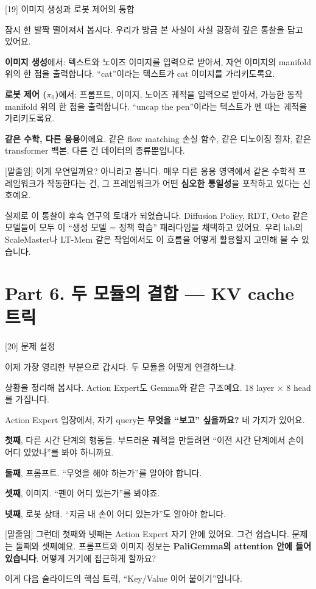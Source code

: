 \documentclass[aspectratio=169,10pt]{beamer}
\newenvironment{script}{%
  \footnotesize
  \setlength{\parskip}{0.5em}
  \setlength{\parindent}{0pt}
}{}
\begin{document}
\begin{frame}{[19] 이미지 생성과 로봇 제어의 통합}
\begin{script}
잠시 한 발짝 떨어져서 봅시다. 우리가 방금 본 사실이 사실 굉장히 깊은 통찰을 담고 있어요.

\textbf{이미지 생성}에서: 텍스트와 노이즈 이미지를 입력으로 받아서, 자연 이미지의 manifold 위의 한 점을 출력합니다. ``cat''이라는 텍스트가 cat 이미지를 가리키도록요.

\textbf{로봇 제어 ($\pi_0$)}에서: 프롬프트, 이미지, 노이즈 궤적을 입력으로 받아서, 가능한 동작 manifold 위의 한 점을 출력합니다. ``uncap the pen''이라는 텍스트가 펜 따는 궤적을 가리키도록요.

\textbf{같은 수학, 다른 응용}이에요. 같은 flow matching 손실 함수, 같은 디노이징 절차, 같은 transformer 백본. 다른 건 데이터의 종류뿐입니다.

[말줄임] 이게 우연일까요? 아니라고 봅니다. \alert{매우 다른 응용 영역에서 같은 수학적 프레임워크가 작동한다}는 건, 그 프레임워크가 어떤 \textbf{심오한 통일성}을 포착하고 있다는 신호예요.

실제로 이 통찰이 후속 연구의 토대가 되었습니다. Diffusion Policy, RDT, Octo 같은 모델들이 모두 이 ``생성 모델 = 정책 학습'' 패러다임을 채택하고 있어요. 우리 lab의 ScaleMaster나 LT-Mem 같은 작업에서도 이 흐름을 어떻게 활용할지 고민해 볼 수 있습니다.
\end{script}
\end{frame}

\section{Part 6. 두 모듈의 결합 --- KV cache 트릭}

\begin{frame}{[20] 문제 설정}
\begin{script}
이제 가장 영리한 부분으로 갑시다. 두 모듈을 어떻게 연결하느냐.

상황을 정리해 봅시다. Action Expert도 Gemma와 같은 구조예요. 18 layer × 8 head를 가집니다.

Action Expert 입장에서, 자기 query는 \textbf{무엇을 ``보고'' 싶을까요?} 네 가지가 있어요.

\textbf{첫째}, 다른 시간 단계의 행동들. 부드러운 궤적을 만들려면 ``이전 시간 단계에서 손이 어디 있었나''를 봐야 하니까요.

\textbf{둘째}, 프롬프트. ``무엇을 해야 하는가''를 알아야 합니다.

\textbf{셋째}, 이미지. ``펜이 어디 있는가''를 봐야죠.

\textbf{넷째}, 로봇 상태. ``지금 내 손이 어디 있는가''도 알아야 합니다.

[말줄임] 그런데 첫째와 넷째는 Action Expert 자기 안에 있어요. 그건 쉽습니다. 문제는 둘째와 셋째예요. 프롬프트와 이미지 정보는 \textbf{PaliGemma의 attention 안에 들어 있습니다}. 어떻게 거기에 접근하게 할까요?

이게 다음 슬라이드의 핵심 트릭, ``Key/Value 이어 붙이기''입니다.
\end{script}
\end{frame}
\end{document}
